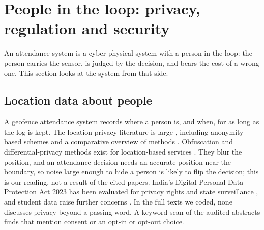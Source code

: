 \documentclass[preprint,12pt]{elsarticle}
\begin{document}
\section{People in the loop: privacy, regulation and security}\label{sec:priv}
An attendance system is a cyber-physical system with a person in the loop: the person carries the sensor, is judged by the decision, and bears the cost of a wrong one. This section looks at the system from that side.

\subsection{Location data about people}
A geofence attendance system records where a person is, and when, for as long as the log is kept. The location-privacy literature is large \cite{liu2018location,krumm2009privacy,beresford2003location}, including anonymity-based schemes \cite{fei2019anonymity} and a comparative overview of methods \cite{chatzikokolakis2017methods}. Obfuscation and differential-privacy methods exist for location-based services \cite{wang2012l2p2,wang2023efficient}. They blur the position, and an attendance decision needs an accurate position near the boundary, so noise large enough to hide a person is likely to flip the decision; this is our reading, not a result of the cited papers. India's Digital Personal Data Protection Act 2023 \cite{dpdp2023} has been evaluated for privacy rights and state surveillance \cite{poulomibanerjeedrsrijanmishra2026evaluating}, and student data raise further concerns \cite{huang2023ethics,pea2022four}. In the \ftN{} full texts we coded, none discusses privacy beyond a passing word. A keyword scan of the \hfN{} audited abstracts finds \hfConsent{} that mention consent or an opt-in or opt-out choice.
\end{document}
